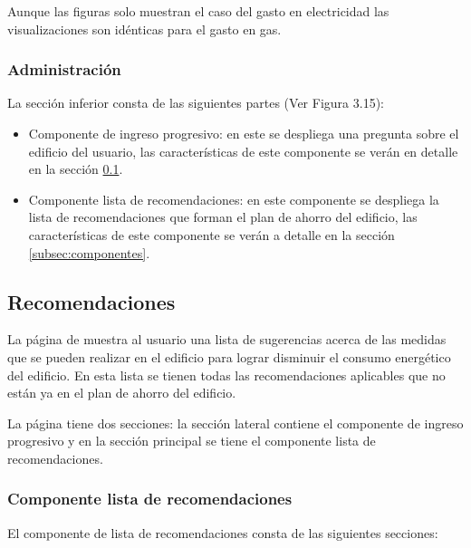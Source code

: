 Aunque las figuras solo muestran el caso del gasto en electricidad las
visualizaciones son idénticas para el gasto en gas.

\subsubsection{Administración}

La sección inferior consta de las siguientes partes (Ver Figura 3.15):
\begin{itemize}
\item Componente de ingreso progresivo: en este se despliega una pregunta
  sobre el edificio del usuario, las características de este componente
  se verán en detalle en la sección \ref{subsec:recomendaciones}.
\item Componente lista de recomendaciones: en este componente se despliega la
  lista de recomendaciones que forman el plan de ahorro del edificio,
  las características de este componente se verán a detalle en la sección
  \ref{subsec:componentes}.
\end{itemize}

\subsection{Recomendaciones}
\label{subsec:recomendaciones}

La página de  muestra al usuario una lista de
sugerencias acerca de las medidas que se pueden realizar en el edificio
para lograr disminuir el consumo energético del edificio. En esta lista se
tienen todas las recomendaciones aplicables que no están ya en el plan
de ahorro del edificio.

La página tiene dos secciones: la sección lateral contiene el componente de
ingreso progresivo y en la sección principal se tiene el componente lista
de recomendaciones.

\subsubsection{Componente lista de recomendaciones}

El componente de lista de recomendaciones consta de las siguientes secciones:

